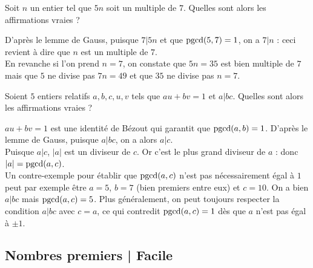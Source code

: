 \begin{question}
 Soit $n$ un entier tel que $5n$ soit un multiple de $7$. Quelles sont alors les affirmations vraies ?
    \begin{answers} 
    \end{answers}
    \begin{explanations} 
    D'après le lemme de Gauss, puisque $7 | 5n$ et que $\mathop{\text{pgcd}}(5,7) = 1$, on a $ 7 | n $ : ceci revient à dire que $n$ est un multiple de $7$.\\
    En revanche si l'on prend $n=7$, on constate que $5n = 35$ est bien multiple de $7$ mais que $5$ ne divise pas $7n=49$ et que $35$ ne divise pas $n=7$.
    \end{explanations}
\end{question}


\begin{question}
 Soient $5$ entiers relatifs $a,b,c,u,v$ tels que $au+bv=1$ et $a | bc$. Quelles sont alors les affirmations vraies ?
    \begin{answers} 
    \end{answers}
    \begin{explanations} 
    $au+bv=1$ est une identité de Bézout qui garantit que $\mathop{\text{pgcd}}(a,b)=1$. D'après le lemme de Gauss, puisque $a|bc$, on a alors $a|c$.\\
    Puisque $a|c$, $|a|$ est un diviseur de $c$. Or c'est le plus grand diviseur de $a$ : donc $|a| = \mathop{\text{pgcd}}(a,c)$.\\
    Un contre-exemple pour établir que $\mathop{\text{pgcd}}(a,c)$ n'est pas nécessairement égal à $1$ peut par exemple être $a=5$, $b=7$ (bien premiers entre eux) et $c=10$. On a bien $a | bc $ mais $\mathop{\text{pgcd}}(a,c) = 5$. Plus généralement, on peut toujours respecter la condition $a | bc$ avec $c=a$, ce qui contredit $\mathop{\text{pgcd}}(a,c)=1$ dès que $a$ n'est pas égal à $\pm 1$.
    \end{explanations}
\end{question}



\subsection{Nombres premiers | Facile}



